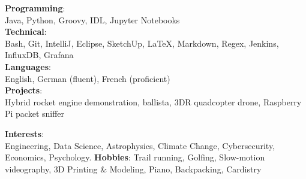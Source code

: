 \documentclass[11pt,a4paper]{article}
\begin{document}
\vspace{-1em}
\begin{multicols*}{2}
\hspace{-2.3em} \sbull \textbf{Programming}: \\ Java, Python, Groovy, IDL, Jupyter Notebooks \\
\sbull \textbf{Technical}: \\ Bash, Git, IntelliJ, Eclipse, SketchUp, \LaTeX, Markdown, Regex, Jenkins, InfluxDB, Grafana \\
\sbull \textbf{Languages}:\\
English, German (fluent), French (proficient)\\
\sbull \textbf{Projects}:\\
Hybrid rocket engine demonstration, ballista, 3DR quadcopter drone, Raspberry Pi packet sniffer

\hspace{-2.3em} \sbull \textbf{Interests}:\\ Engineering, Data Science, Astrophysics, Climate Change, Cybersecurity, Economics, Psychology.
\sbull \textbf{Hobbies}: Trail running, Golfing, Slow-motion videography, 3D Printing \& Modeling, Piano, Backpacking, Cardistry
	
\end{multicols*}
\end{document}

